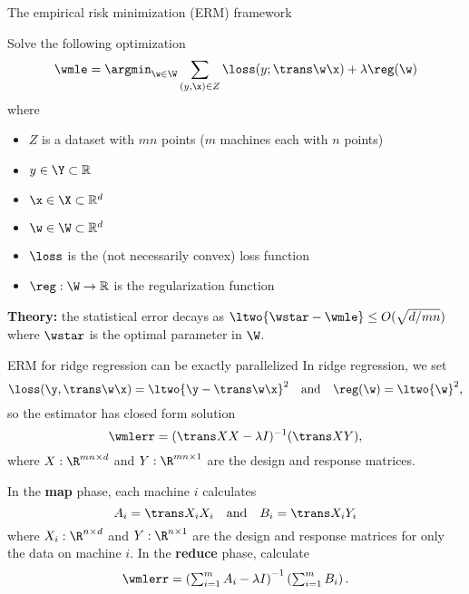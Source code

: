 \begin{frame}{The empirical risk minimization (ERM) framework}

Solve the following optimization
\begin{equation}
\wmle = \argmin_{\w\in\W} \sum_{(y,\x)\in Z} \loss(y;\trans\w\x) + \lambda\reg(\w)
\end{equation}
where
\begin{itemize}
\item $Z$ is a dataset with $mn$ points ($m$ machines each with $n$ points)
\item $y\in\Y\subset\mathbb R$
\item $\x\in\X\subset\mathbb R^d$
\item $\w\in\W\subset\mathbb R^d$
\item $\loss$ is the (not necessarily convex) loss function
\item $\reg : \W\to\mathbb R$ is the regularization function
\end{itemize}

\vspace{0.15in}
\textbf{Theory:} the statistical error decays as $\ltwo{\wstar-\wmle} \le O(\sqrt{d/mn})$ where $\wstar$ is the optimal parameter in $\W$.
\end{frame}


\begin{frame}{ERM for ridge regression can be exactly parallelized}
In ridge regression, we set
\begin{equation}
\loss(\y,\trans\w\x) = \ltwo{\y-\trans\w\x}^2 
~~~ \text{and} ~~~
\reg(\w) = \ltwo{\w}^2,
\end{equation}
so the estimator has closed form solution
\begin{equation}
\wmlerr = (\trans X X - \lambda I)^{-1}(\trans X Y),
\end{equation}
where $X : \R^{mn\times d}$ and $Y : \R^{mn\times 1}$ are the design and response matrices.

\pause
\hrulefill
\vspace{0.1in}

In the \textbf{map} phase, each machine $i$ calculates
\begin{equation}
A_i = \trans X_i X_i
~~~\text{and}~~~
B_i = \trans X_i Y_i
\end{equation}
where $X_i : \R^{n\times d}$ and $Y : \R^{n\times 1}$ are the design and response matrices for only the data on machine $i$.
In the \textbf{reduce} phase, calculate
\begin{equation}
\textstyle
\wmlerr = \left(\sum_{i=1}^m A_i - \lambda I\right)^{-1}\left(\sum_{i=1}^m B_i\right).
\end{equation}
\end{frame}
